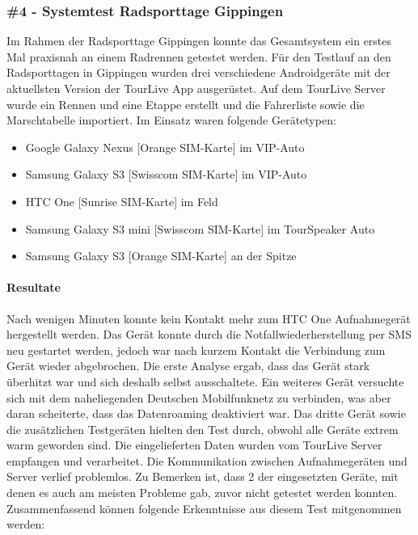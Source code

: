 \subsubsection{\#4 - Systemtest Radsporttage Gippingen}
\label{sec:testberichtgippingen}
Im Rahmen der Radsporttage Gippingen konnte das Gesamtsystem ein erstes Mal praxisnah an einem Radrennen getestet werden. Für den Testlauf an den Radsporttagen in Gippingen wurden drei verschiedene Androidgeräte mit der aktuellsten Version der TourLive App ausgerüstet. Auf dem TourLive Server wurde ein Rennen und eine Etappe erstellt und die Fahrerliste sowie die Marschtabelle importiert. Im Einsatz waren folgende Gerätetypen:
\begin{itemize} [noitemsep,topsep=0pt]
	\item Google Galaxy Nexus [Orange SIM-Karte] im VIP-Auto
	\item Samsung Galaxy S3 [Swisscom SIM-Karte] im VIP-Auto
	\item HTC One [Sunrise SIM-Karte] im Feld
	\item Samsung Galaxy S3 mini [Swisscom SIM-Karte] im TourSpeaker Auto
	\item Samsung Galaxy S3 [Orange SIM-Karte] an der Spitze
\end{itemize}

\paragraph*{Resultate}
Nach wenigen Minuten konnte kein Kontakt mehr zum HTC One Aufnahmegerät hergestellt werden. Das Gerät konnte durch die Notfallwiederherstellung per SMS neu gestartet werden, jedoch war nach kurzem Kontakt die Verbindung zum Gerät wieder abgebrochen. Die erste Analyse ergab, dass das Gerät stark überhitzt war und sich deshalb selbst ausschaltete. Ein weiteres Gerät versuchte sich mit dem naheliegenden Deutschen Mobilfunknetz zu verbinden, was aber daran scheiterte, dass das Datenroaming deaktiviert war. Das dritte Gerät sowie die zusätzlichen Testgeräten hielten den Test durch, obwohl alle Geräte extrem warm geworden sind. Die eingelieferten Daten wurden vom TourLive Server empfangen und verarbeitet. Die Kommunikation zwischen Aufnahmegeräten und Server verlief problemlos. Zu Bemerken ist, dass 2 der eingesetzten Geräte, mit denen es auch am meisten Probleme gab, zuvor nicht getestet werden konnten. Zusammenfassend können folgende Erkenntnisse aus diesem Test mitgenommen werden:

